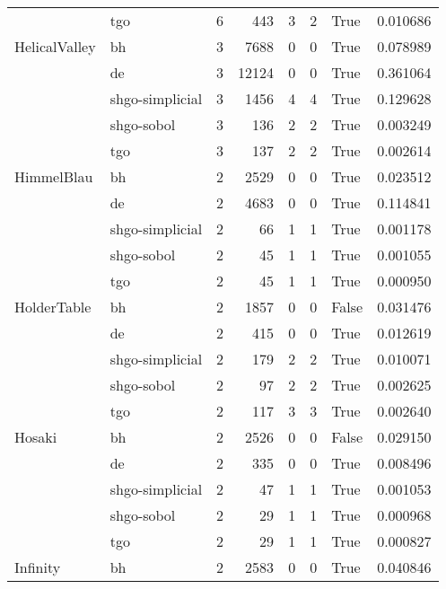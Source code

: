 \begin{longtable}{llrrrrlr}
         & tgo &     6 &      443 &      3 &       2 &    True &    0.010686 \\
HelicalValley & bh &     3 &     7688 &      0 &       0 &    True &    0.078989 \\
         & de &     3 &    12124 &      0 &       0 &    True &    0.361064 \\
         & shgo-simplicial &     3 &     1456 &      4 &       4 &    True &    0.129628 \\
         & shgo-sobol &     3 &      136 &      2 &       2 &    True &    0.003249 \\
         & tgo &     3 &      137 &      2 &       2 &    True &    0.002614 \\
HimmelBlau & bh &     2 &     2529 &      0 &       0 &    True &    0.023512 \\
         & de &     2 &     4683 &      0 &       0 &    True &    0.114841 \\
         & shgo-simplicial &     2 &       66 &      1 &       1 &    True &    0.001178 \\
         & shgo-sobol &     2 &       45 &      1 &       1 &    True &    0.001055 \\
         & tgo &     2 &       45 &      1 &       1 &    True &    0.000950 \\
HolderTable & bh &     2 &     1857 &      0 &       0 &   False &    0.031476 \\
         & de &     2 &      415 &      0 &       0 &    True &    0.012619 \\
         & shgo-simplicial &     2 &      179 &      2 &       2 &    True &    0.010071 \\
         & shgo-sobol &     2 &       97 &      2 &       2 &    True &    0.002625 \\
         & tgo &     2 &      117 &      3 &       3 &    True &    0.002640 \\
Hosaki & bh &     2 &     2526 &      0 &       0 &   False &    0.029150 \\
         & de &     2 &      335 &      0 &       0 &    True &    0.008496 \\
         & shgo-simplicial &     2 &       47 &      1 &       1 &    True &    0.001053 \\
         & shgo-sobol &     2 &       29 &      1 &       1 &    True &    0.000968 \\
         & tgo &     2 &       29 &      1 &       1 &    True &    0.000827 \\
Infinity & bh &     2 &     2583 &      0 &       0 &    True &    0.040846 \\

\end{longtable}
